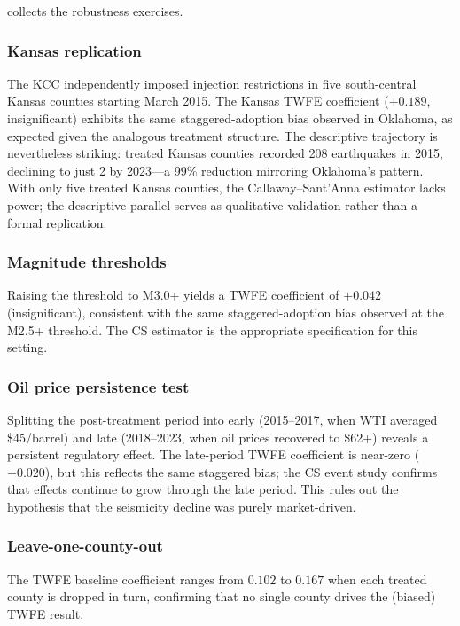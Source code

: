 \documentclass[12pt]{article}
\begin{document}
 collects the robustness exercises.



\subsubsection*{Kansas replication} The KCC independently imposed injection restrictions in five south-central Kansas counties starting March 2015. The Kansas TWFE coefficient ($+0.189$, insignificant) exhibits the same staggered-adoption bias observed in Oklahoma, as expected given the analogous treatment structure. The descriptive trajectory is nevertheless striking: treated Kansas counties recorded 208 earthquakes in 2015, declining to just 2 by 2023---a 99\% reduction mirroring Oklahoma's pattern. With only five treated Kansas counties, the Callaway--Sant'Anna estimator lacks power; the descriptive parallel serves as qualitative validation rather than a formal replication.

\subsubsection*{Magnitude thresholds} Raising the threshold to M3.0+ yields a TWFE coefficient of $+0.042$ (insignificant), consistent with the same staggered-adoption bias observed at the M2.5+ threshold. The CS estimator is the appropriate specification for this setting.

\subsubsection*{Oil price persistence test} Splitting the post-treatment period into early (2015--2017, when WTI averaged \$45/barrel) and late (2018--2023, when oil prices recovered to \$62+) reveals a persistent regulatory effect. The late-period TWFE coefficient is near-zero ($-0.020$), but this reflects the same staggered bias; the CS event study confirms that effects continue to grow through the late period. This rules out the hypothesis that the seismicity decline was purely market-driven.

\subsubsection*{Leave-one-county-out} The TWFE baseline coefficient ranges from $0.102$ to $0.167$ when each treated county is dropped in turn, confirming that no single county drives the (biased) TWFE result.
\end{document}
